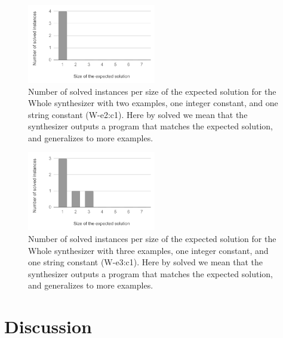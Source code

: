 \begin{figure}
  \centering
  \includegraphics[width=0.5\textwidth]{assets/bar-chart-expected-W-e2-c1.pdf}
  \caption{Number of solved instances per size of the expected solution for
    the Whole synthesizer with two examples, one integer constant, and one
    string constant (W-e2:c1). Here by solved we mean that the synthesizer
    outputs a program that matches the expected solution, and generalizes to
    more examples.}
  \label{fig:bar-chart-expected-W-e2-c1}
\end{figure}

\begin{figure}
  \centering
  \includegraphics[width=0.5\textwidth]{assets/bar-chart-expected-W-e3-c1.pdf}
  \caption{Number of solved instances per size of the expected solution for
    the Whole synthesizer with three examples, one integer constant, and one
    string constant (W-e3:c1). Here by solved we mean that the synthesizer
    outputs a program that matches the expected solution, and generalizes to
    more examples.}
  \label{fig:bar-chart-expected-W-e3-c1}
\end{figure}

\section{Discussion}
\label{sec:discussion}

